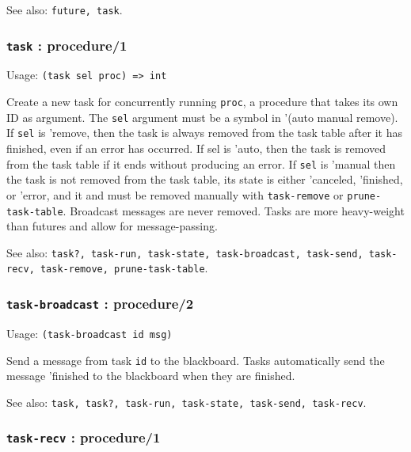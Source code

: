 \documentclass[
]{article}
\newcommand{\passthrough}[1]{#1}
\begin{document}
See also: \passthrough{\lstinline!future, task!}.

\hypertarget{task-procedure1}{%
\subsubsection{\texorpdfstring{\texttt{task} :
procedure/1}{task : procedure/1}}\label{task-procedure1}}

Usage: \passthrough{\lstinline!(task sel proc) => int!}

Create a new task for concurrently running
\passthrough{\lstinline!proc!}, a procedure that takes its own ID as
argument. The \passthrough{\lstinline!sel!} argument must be a symbol in
'(auto manual remove). If \passthrough{\lstinline!sel!} is 'remove, then
the task is always removed from the task table after it has finished,
even if an error has occurred. If sel is 'auto, then the task is removed
from the task table if it ends without producing an error. If
\passthrough{\lstinline!sel!} is 'manual then the task is not removed
from the task table, its state is either 'canceled, 'finished, or
'error, and it and must be removed manually with
\passthrough{\lstinline!task-remove!} or
\passthrough{\lstinline!prune-task-table!}. Broadcast messages are never
removed. Tasks are more heavy-weight than futures and allow for
message-passing.

See also:
\passthrough{\lstinline!task?, task-run, task-state, task-broadcast, task-send, task-recv, task-remove, prune-task-table!}.

\hypertarget{task-broadcast-procedure2}{%
\subsubsection{\texorpdfstring{\texttt{task-broadcast} :
procedure/2}{task-broadcast : procedure/2}}\label{task-broadcast-procedure2}}

Usage: \passthrough{\lstinline!(task-broadcast id msg)!}

Send a message from task \passthrough{\lstinline!id!} to the blackboard.
Tasks automatically send the message 'finished to the blackboard when
they are finished.

See also:
\passthrough{\lstinline!task, task?, task-run, task-state, task-send, task-recv!}.

\hypertarget{task-recv-procedure1}{%
\subsubsection{\texorpdfstring{\texttt{task-recv} :
procedure/1}{task-recv : procedure/1}}\label{task-recv-procedure1}}
\end{document}
